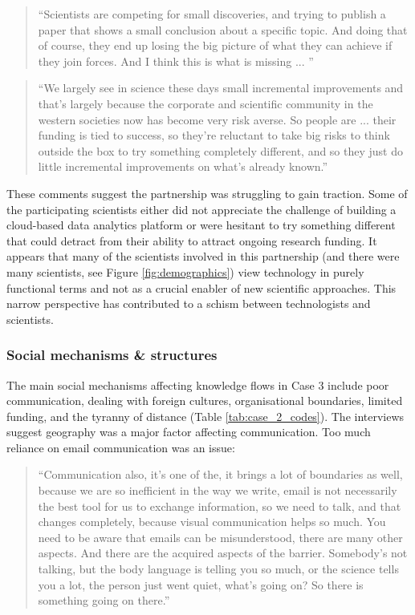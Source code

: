 \begin{quote}
\small
\enquote{Scientists are competing for small discoveries, and trying to publish a paper that shows a small conclusion about a specific topic. And doing that of course, they end up losing the big picture of what they can achieve if they join forces. And I think this is what is missing ... } \\
\end{quote}

\begin{quote}
\small
\enquote{We largely see in science these days small incremental improvements and that's largely because the corporate and scientific community in the western societies now has become very risk averse. So people are ... their funding is tied to success, so they're reluctant to take big risks to think outside the box to try something completely different, and so they just do little incremental improvements on what's already known.} \\
\end{quote}

These comments suggest the partnership was struggling to gain traction. Some of the participating scientists either did not appreciate the challenge of building a cloud-based data analytics platform or were hesitant to try something different that could detract from their ability to attract ongoing research funding. It appears that many of the scientists involved in this partnership (and there were many scientists, see Figure \ref{fig:demographics}) view technology in purely functional terms and not as a crucial enabler of new scientific approaches. This narrow perspective has contributed to a schism between technologists and scientists.

\subsubsection{Social mechanisms \& structures}

The main social mechanisms affecting knowledge flows in Case 3 include poor communication, dealing with foreign cultures, organisational boundaries, limited funding, and the tyranny of distance (Table \ref{tab:case_2_codes}). The interviews suggest geography was a major factor affecting communication. Too much reliance on email communication was an issue:

\begin{quote}
\small
\enquote{Communication also, it's one of the, it brings a lot of boundaries as well, because we are so inefficient in the way we write, email is not necessarily the best tool for us to exchange information, so we need to talk, and that changes completely, because visual communication helps so much. You need to be aware that emails can be misunderstood, there are many other aspects. And there are the acquired aspects of the barrier. Somebody's not talking, but the body language is telling you so much, or the science tells you a lot, the person just went quiet, what's going on? So there is something going on there.} \\
\end{quote}

